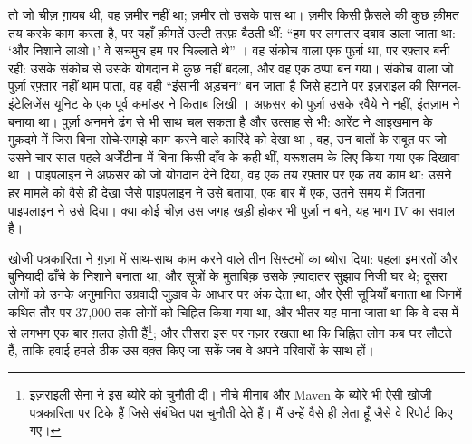 तो जो चीज़ ग़ायब थी, वह ज़मीर नहीं था; ज़मीर तो उसके पास था। ज़मीर किसी फ़ैसले की कुछ क़ीमत तय करके काम करता है, पर यहाँ क़ीमतें उल्टी तरफ़ बैठती थीं: “हम पर लगातार दबाव डाला जाता था: ‘और निशाने लाओ।’ वे सचमुच हम पर चिल्लाते थे” \autocite{abraham2024lavender}। वह संकोच वाला एक पुर्ज़ा था, पर रफ़्तार बनी रही: उसके संकोच से उसके योगदान में कुछ नहीं बदला, और वह एक ठप्पा बन गया। संकोच वाला जो पुर्ज़ा रफ़्तार नहीं थाम पाता, वह वही “इंसानी अड़चन” बन जाता है जिसे हटाने पर इज़राइल की सिग्नल-इंटेलिजेंस यूनिट के एक पूर्व कमांडर ने किताब लिखी \autocite{ys2021humanmachine}। अफ़सर को पुर्ज़ा उसके रवैये ने नहीं, इंतज़ाम ने बनाया था। पुर्ज़ा अनमने ढंग से भी साथ चल सकता है और उत्साह से भी: आरेंट ने आइखमान के मुक़दमे में जिस बिना सोचे-समझे काम करने वाले कारिंदे को देखा था \autocite{arendt1963eichmann}, वह, उन बातों के सबूत पर जो उसने चार साल पहले अर्जेंटीना में बिना किसी दाँव के कही थीं, यरूशलम के लिए किया गया एक दिखावा था \autocite{stangneth2014eichmann}। पाइपलाइन ने अफ़सर को जो योगदान देने दिया, वह एक तय रफ़्तार पर एक तय काम था: उसने हर मामले को वैसे ही देखा जैसे पाइपलाइन ने उसे बताया, एक बार में एक, उतने समय में जितना पाइपलाइन ने उसे दिया। क्या कोई चीज़ उस जगह खड़ी होकर भी पुर्ज़ा न बने, यह भाग IV का सवाल है।

खोजी पत्रकारिता ने ग़ज़ा में साथ-साथ काम करने वाले तीन सिस्टमों का ब्योरा दिया: पहला इमारतों और बुनियादी ढाँचे के निशाने बनाता था, और सूत्रों के मुताबिक़ उसके ज़्यादातर सुझाव निजी घर थे; दूसरा लोगों को उनके अनुमानित उग्रवादी जुड़ाव के आधार पर अंक देता था, और ऐसी सूचियाँ बनाता था जिनमें कथित तौर पर 37,000 तक लोगों को चिह्नित किया गया था, और भीतर यह माना जाता था कि वे दस में से लगभग एक बार ग़लत होती हैं\footnote{इज़राइली सेना ने इस ब्योरे को चुनौती दी। नीचे मीनाब और Maven के ब्योरे भी ऐसी खोजी पत्रकारिता पर टिके हैं जिसे संबंधित पक्ष चुनौती देते हैं। मैं उन्हें वैसे ही लेता हूँ जैसे वे रिपोर्ट किए गए।}; और तीसरा इस पर नज़र रखता था कि चिह्नित लोग कब घर लौटते हैं, ताकि हवाई हमले ठीक उस वक़्त किए जा सकें जब वे अपने परिवारों के साथ हों।


